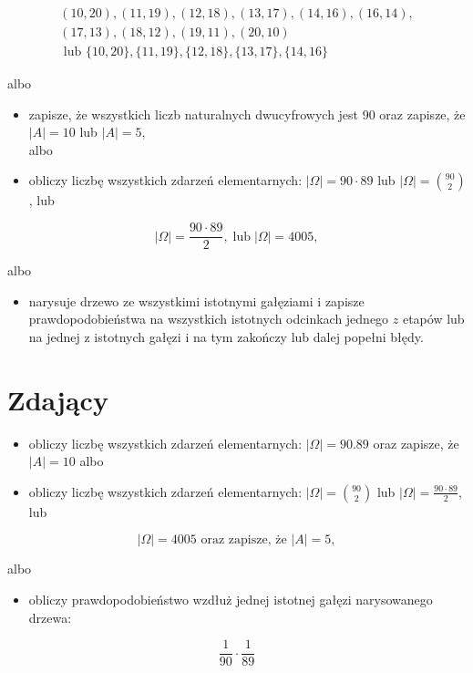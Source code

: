 \documentclass[10pt]{article}
\begin{document}
$$
\begin{gathered}
(10,20),(11,19),(12,18),(13,17),(14,16),(16,14), \\
(17,13),(18,12),(19,11),(20,10) \\
\text { lub }\{10,20\},\{11,19\},\{12,18\},\{13,17\},\{14,16\}
\end{gathered}
$$

albo

\begin{itemize}
  \item zapisze, że wszystkich liczb naturalnych dwucyfrowych jest 90 oraz zapisze, że $|A|=10$ lub $|A|=5$,\\
albo
  \item obliczy liczbę wszystkich zdarzeń elementarnych: $|\Omega|=90 \cdot 89$ lub $|\Omega|=\binom{90}{2}$, lub
\end{itemize}

$$
|\Omega|=\frac{90 \cdot 89}{2}, \operatorname{lub}|\Omega|=4005,
$$

albo

\begin{itemize}
  \item narysuje drzewo ze wszystkimi istotnymi gałęziami i zapisze prawdopodobieństwa na wszystkich istotnych odcinkach jednego $z$ etapów lub na jednej z istotnych gałęzi i na tym zakończy lub dalej popełni błędy.
\end{itemize}

\section*{Zdający}
\begin{itemize}
  \item obliczy liczbę wszystkich zdarzeń elementarnych: $|\Omega|=90.89$ oraz zapisze, że $|A|=10$ albo
  \item obliczy liczbę wszystkich zdarzeń elementarnych: $|\Omega|=\binom{90}{2}$ lub $|\Omega|=\frac{90 \cdot 89}{2}$, lub
\end{itemize}

$$
|\Omega|=4005 \text { oraz zapisze, że }|A|=5,
$$

albo

\begin{itemize}
  \item obliczy prawdopodobieństwo wzdłuż jednej istotnej gałęzi narysowanego drzewa:
\end{itemize}

$$
\frac{1}{90} \cdot \frac{1}{89}
$$
\end{document}
